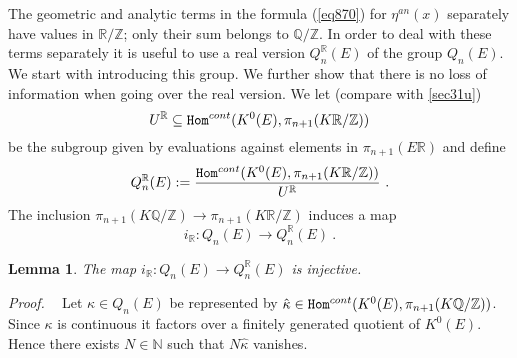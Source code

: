 \documentclass[12pt]{article}
\newtheorem{lem}[theorem]{Lemma}
\newcommand{\proof}{{\it Proof.$\:\:\:\:$}}
\newcommand{\nat}{{\mathbb{N}}}
\newcommand{\Z}{{\mathbb{Z}}}
\newcommand{\Q}{{\mathbb{Q}}}
\newcommand{\R}{{\mathbb{R}}}
\newcommand{\Hom}{{\tt Hom}}
\newcommand{\Td}{{\mathbf{Td}}}
\begin{document}
%


%


%


The geometric and analytic terms in the formula (\ref{eq870}) for $\eta^{an}(x)$
separately have values in $\R/\Z$; only their sum belongs to $\Q/\Z$. In order to deal with these terms separately it is useful to use a real version $Q_{n}^{\R}(E)$ of the group $Q_{n}(E)$.
We start with introducing this group. We further show that there is no  loss of information when going over the  real version. 
We let (compare with \eqref{sec31u})
\begin{equation}\label{eq1002}U^{\R}\subseteq \Hom^{cont}(K^{0}(E),\pi_{n+1}(K\R/\Z))\end{equation} be the subgroup
given by evaluations against elements in
$\pi_{n+1}(E\R)$ and define
\begin{equation}\label{eq1003}Q^{\R}_{n}(E):=\frac{\Hom^{cont}(K^{0}(E),\pi_{n+1}(K\R/\Z))}{U^{\R}}\ .\end{equation}
The inclusion $\pi_{n+1}(K\Q/\Z)\to \pi_{n+1}(K\R/\Z)$ induces a map
$$i_{\R}:Q_{n}(E)\to Q_{n}^{\R}(E)\ .$$ 
\begin{lem}
The map $i_{\R}:Q_{n}(E)\to Q_{n}^{\R}(E)$ is injective.
\end{lem}
\proof
Let $\kappa\in Q_{n}(E)$ be represented by
$\hat \kappa\in \Hom^{cont}(K^{0}(E),\pi_{n+1}(K\Q/\Z))$.
Since $\kappa$ is continuous it factors over a finitely generated quotient of 
$K^{0}(E)$. Hence there exists $N\in \nat$ such that $N\hat\kappa$ vanishes.
\end{document}
